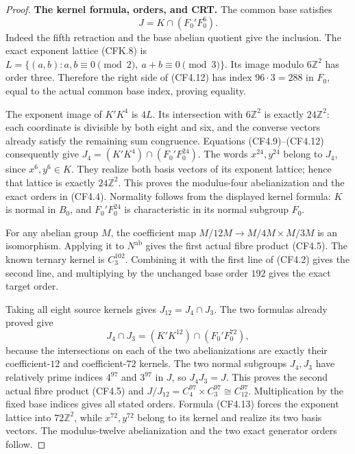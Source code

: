 \begin{proof}
\par\medskip\noindent\textbf{The kernel formula, orders, and CRT.}\quad
The common base satisfies
\[
                         J=K\cap(F_0'F_0^6).
                                                               \tag{CF4.12}
\]
Indeed the fifth retraction and the base abelian quotient give
the inclusion.  The exact exponent lattice (CFK.8) is
$L=\{(a,b):a,b\equiv0\pmod2,\ a+b\equiv0\pmod3\}$.
Its image modulo $6\mathbb Z^2$ has order three.  Therefore the
right side of (CF4.12) has index $96\cdot3=288$ in $F_0$, equal
to the actual common base index, proving equality.

The exponent image of $K'K^4$ is $4L$.  Its intersection with
$6\mathbb Z^2$ is exactly $24\mathbb Z^2$: each coordinate
is divisible by both eight and six, and the converse vectors
already satisfy the remaining sum congruence.  Equations
(CF4.9)--(CF4.12) consequently give
$J_4=(K'K^4)\cap(F_0'F_0^{24})$.
The words $x^{24},y^{24}$ belong to $J_4$, since $x^6,y^6\in K$.
They realize both basis vectors of its exponent lattice; hence
that lattice is exactly $24\mathbb Z^2$.  This proves the
modulus-four abelianization and the exact orders in (CF4.4).
Normality follows from the displayed kernel formula: $K$ is
normal in $B_0$, and $F_0'F_0^{24}$ is characteristic in its
normal subgroup $F_0$.

For any abelian group $M$, the coefficient map
$M/12M\to M/4M\times M/3M$ is an isomorphism.  Applying it to
$N^{\mathrm{ab}}$ gives the first actual fibre product (CF4.5).
The known ternary kernel is $C_3^{102}$.  Combining it with the
first line of (CF4.2) gives the second line, and multiplying by
the unchanged base order $192$ gives the exact target order.

Taking all eight source kernels gives $J_{12}=J_4\cap J_3$.
The two formulas already proved give
\[
 J_4\cap J_3=(K'K^{12})\cap(F_0'F_0^{72}),
                                                               \tag{CF4.13}
\]
because the intersections on each of the two abelianizations
are exactly their coefficient-$12$ and coefficient-$72$ kernels.
The two normal subgroups $J_4,J_3$ have relatively prime indices
$4^{97}$ and $3^{97}$ in $J$, so $J_4J_3=J$.
This proves the second actual fibre product (CF4.5) and
$J/J_{12}=C_4^{97}\times C_3^{97}\cong C_{12}^{97}$.
Multiplication by the fixed base indices gives all stated orders.
Formula (CF4.13) forces the exponent lattice into $72\mathbb Z^2$,
while $x^{72},y^{72}$ belong to its kernel and realize its two
basis vectors.  The modulus-twelve abelianization and the two
exact generator orders follow.
\end{proof}

